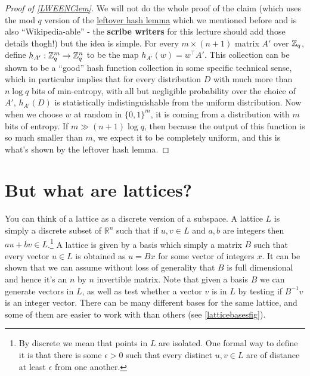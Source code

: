 \begin{proof}[Proof of \cref{LWEENClem}]
We will not do the whole proof of the claim (which uses the mod \(q\)
version of the \href{https://goo.gl/KXpccP}{leftover hash lemma} which
we mentioned before and is also ``Wikipedia-able'' - the \textbf{scribe
writers} for this lecture should add those details thogh!) but the idea
is simple. For every \(m\times (n+1)\) matrix \(A'\) over \({\mathbb{Z}}_q\),
define \(h_{A'}:{\mathbb{Z}}_q^m \rightarrow {\mathbb{Z}}_q^n\) to be the map
\(h_{A'}(w)=w^\top A'\). This collection can be shown to be a ``good''
hash function collection in some specific technical sense, which in
particular implies that for every distribution \(D\) with much more than
\(n\log q\) bits of min-entropy, with all but negligible probability
over the choice of \(A'\), \(h_{A'}(D)\) is statistically
indistinguishable from the uniform distribution. Now when we choose
\(w\) at random in \(\{0,1\}^m\), it is coming from a distribution with
\(m\) bits of entropy. If \(m \gg (n+1)\log q\), then because the output
of this function is so much smaller than \(m\), we expect it to be
completely uniform, and this is what's shown by the leftover hash lemma.

\end{proof}


\section{But what are lattices?}\label{But-what-are-lattices}

You can think of a lattice as a discrete version of a subspace. A
lattice \(L\) is simply a discrete subset of \(\mathbb{R}^n\) such that
if \(u,v\in L\) and \(a,b\) are integers then \(au+bv\in L\).\footnote{By
  discrete we mean that points in \(L\) are isolated. One formal way to
  define it is that there is some \(\epsilon>0\) such that every
  distinct \(u,v \in L\) are of distance at least \(\epsilon\) from one
  another.} A lattice is given by a basis which simply a matrix \(B\)
such that every vector \(u\in L\) is obtained as \(u=Bx\) for some
vector of integers \(x\). It can be shown that we can assume without
loss of generality that \(B\) is full dimensional and hence it's an
\(n\) by \(n\) invertible matrix. Note that given a basis \(B\) we can
generate vectors in \(L\), as well as test whether a vector \(v\) is in
\(L\) by testing if \(B^{-1}v\) is an integer vector. There can be many
different bases for the same lattice, and some of them are easier to
work with than others (see \cref{latticebasesfig}).


